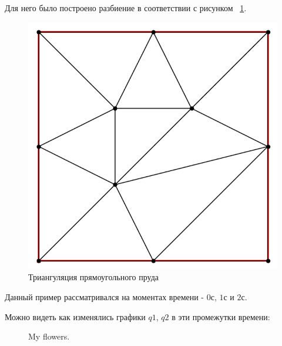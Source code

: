 \documentclass[14pt]{extreport}
\begin{document}
Для него было построено разбиение в соответствии с рисунком ~\ref{img:ex1:mesh}.

\begin{figure}[H]
\centerline{
\includegraphics[width=0.5\linewidth]{images/ex1/mesh}}
\caption{Триангуляция прямоугольного пруда}
\label{img:ex1:mesh}
\end{figure}


Данный пример рассматривался на моментах времени - $0$с, $1$с и $2$с.

Можно видеть как изменялись графики $q1$, $q2$ в эти промежутки времени:

\begin{figure}[H]
  \centering
  \hfill
  \hfill
  \caption{My flowers.}
\end{figure}
\end{document}
